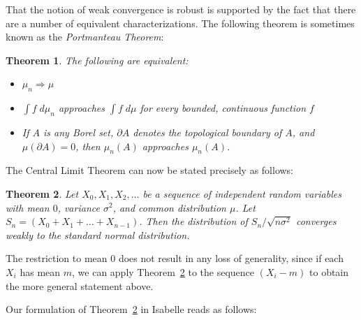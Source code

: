 \documentclass{article}
\newtheorem{theorem}{Theorem}[section]
\begin{document}
That the notion of weak convergence is robust is supported by the fact that there are a number of equivalent characterizations. The following theorem is sometimes known as the \emph{Portmanteau Theorem}:
\begin{theorem}
The following are equivalent:
\begin{itemize}
 \item $\mu_n \Rightarrow \mu$
 \item $\int f \; d\mu_n$ approaches $\int f \; d\mu$ for every bounded, continuous function $f$
 \item If $A$ is any Borel set, $\partial A$ denotes the topological boundary of $A$, and $\mu(\partial A) = 0$, then $\mu_n(A)$ approaches $\mu_n(A)$. 
\end{itemize}
\end{theorem}
The Central Limit Theorem can now be stated precisely as follows:
\begin{theorem}
\label{theorem:clt}
Let $X_0, X_1, X_2, \ldots$ be a sequence of independent random variables with mean $0$, variance $\sigma^2$, and common distribution $\mu$. Let $S_n = (X_0 + X_1 + \ldots + X_{n-1})$. Then the distribution of $S_n / \sqrt{n \sigma^2}$ converges weakly to the standard normal distribution.
\end{theorem}
The restriction to mean $0$ does not result in any loss of generality, since if each $X_i$ has mean $m$, we can apply Theorem~\ref{theorem:clt} to the sequence $(X_i - m)$ to obtain the more general statement above. 

Our formulation of Theorem~\ref{theorem:clt} in Isabelle reads as follows:

\bigskip
\end{document}
